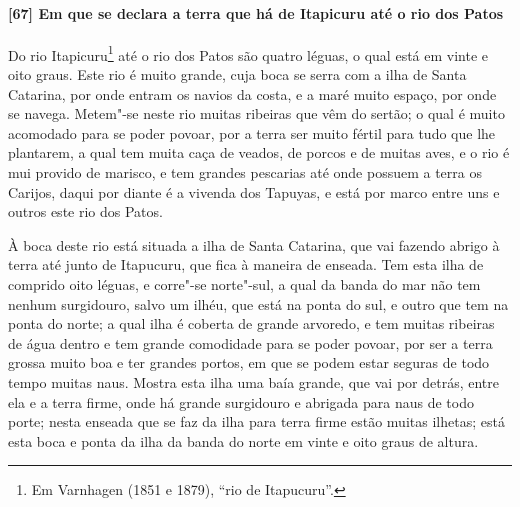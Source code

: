 \begin{linenumbers}
\paragraph{[67] Em que se declara a terra que há de Itapicuru até o rio dos Patos} \quad
Do rio Itapicuru\footnote{ Em Varnhagen (1851 e 1879), ``rio de Itapucuru''.} até o rio
dos Patos são quatro léguas, o qual está em vinte e oito graus. Este rio é muito grande,
cuja boca se serra com a ilha de Santa Catarina, por onde entram os navios da costa, e a
maré muito espaço, por onde se navega. Metem"-se neste rio muitas ribeiras que vêm do
sertão; o qual é muito acomodado para se poder povoar, por a terra ser muito fértil para
tudo que lhe plantarem, a qual tem muita caça de veados, de porcos e de muitas aves, e o
rio é mui provido de marisco, e tem grandes pescarias até onde possuem a terra os Carijos,
daqui por diante é a vivenda dos Tapuyas, e está por marco entre uns e outros este rio dos
Patos.

À boca deste rio está situada a ilha de Santa Catarina, que vai fazendo abrigo à terra até
junto de Itapucuru, que fica à maneira de enseada. Tem esta ilha de comprido oito léguas,
e corre"-se norte"-sul, a qual da banda do mar não tem nenhum surgidouro, salvo um ilhéu,
que está na ponta do sul, e outro que tem na ponta do norte; a qual ilha é coberta de
grande arvoredo, e tem muitas ribeiras de água dentro e tem grande comodidade para se
poder povoar, por ser a terra grossa muito boa e ter grandes portos, em que se podem estar
seguras de todo tempo muitas naus. Mostra esta ilha uma baía grande, que vai por detrás,
entre ela e a terra firme, onde há grande surgidouro e abrigada para naus de todo porte;
nesta enseada que se faz da ilha para terra firme estão muitas ilhetas; está esta boca e
ponta da ilha da banda do norte em vinte e oito graus de altura.


\end{linenumbers}
